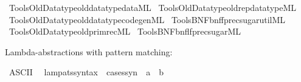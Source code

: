 \begin{isabellebody}
\isamarkupfalse%
\ {\isacartoucheopen}Tools{\isacharslash}{\kern0pt}Old{\isacharunderscore}{\kern0pt}Datatype{\isacharslash}{\kern0pt}old{\isacharunderscore}{\kern0pt}datatype{\isacharunderscore}{\kern0pt}data{\isachardot}{\kern0pt}ML{\isacartoucheclose}\isanewline
{}\isamarkupfalse%
\ {\isacartoucheopen}Tools{\isacharslash}{\kern0pt}Old{\isacharunderscore}{\kern0pt}Datatype{\isacharslash}{\kern0pt}old{\isacharunderscore}{\kern0pt}rep{\isacharunderscore}{\kern0pt}datatype{\isachardot}{\kern0pt}ML{\isacartoucheclose}\isanewline
{}\isamarkupfalse%
\ {\isacartoucheopen}Tools{\isacharslash}{\kern0pt}Old{\isacharunderscore}{\kern0pt}Datatype{\isacharslash}{\kern0pt}old{\isacharunderscore}{\kern0pt}datatype{\isacharunderscore}{\kern0pt}codegen{\isachardot}{\kern0pt}ML{\isacartoucheclose}\isanewline
{}\isamarkupfalse%
\ {\isacartoucheopen}Tools{\isacharslash}{\kern0pt}BNF{\isacharslash}{\kern0pt}bnf{\isacharunderscore}{\kern0pt}fp{\isacharunderscore}{\kern0pt}rec{\isacharunderscore}{\kern0pt}sugar{\isacharunderscore}{\kern0pt}util{\isachardot}{\kern0pt}ML{\isacartoucheclose}\isanewline
{}\isamarkupfalse%
\ {\isacartoucheopen}Tools{\isacharslash}{\kern0pt}Old{\isacharunderscore}{\kern0pt}Datatype{\isacharslash}{\kern0pt}old{\isacharunderscore}{\kern0pt}primrec{\isachardot}{\kern0pt}ML{\isacartoucheclose}\isanewline
{}\isamarkupfalse%
\ {\isacartoucheopen}Tools{\isacharslash}{\kern0pt}BNF{\isacharslash}{\kern0pt}bnf{\isacharunderscore}{\kern0pt}lfp{\isacharunderscore}{\kern0pt}rec{\isacharunderscore}{\kern0pt}sugar{\isachardot}{\kern0pt}ML{\isacartoucheclose}%
\endisatagML
{\isafoldML}%
%
\isadelimML
%
\endisadelimML
%
\begin{isamarkuptext}%
Lambda-abstractions with pattern matching:%
\end{isamarkuptext}\isamarkuptrue%
\isamarkupfalse%
\ {\isacharparenleft}{\kern0pt}ASCII{\isacharparenright}{\kern0pt}\isanewline
\ \ {\isachardoublequoteopen}{\isacharunderscore}{\kern0pt}lam{\isacharunderscore}{\kern0pt}pats{\isacharunderscore}{\kern0pt}syntax{\isachardoublequoteclose}\ {\isacharcolon}{\kern0pt}{\isacharcolon}{\kern0pt}\ {\isachardoublequoteopen}cases{\isacharunderscore}{\kern0pt}syn\ {\isasymRightarrow}\ {\isacharprime}{\kern0pt}a\ {\isasymRightarrow}\ {\isacharprime}{\kern0pt}b{\isachardoublequoteclose}\ \ {\isacharparenleft}{\kern0pt}{\isachardoublequoteopen}{\isacharparenleft}{\kern0pt}{\isacharpercent}{\kern0pt}{\isacharunderscore}{\kern0pt}{\isacharparenright}{\kern0pt}{\isachardoublequoteclose}\ {}{}{\isacharparenright}{\kern0pt}\isanewline

\end{isabellebody}

